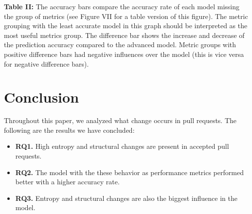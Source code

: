 \documentclass[10pt, conference]{IEEEtran}
\begin{document}
\newline \small \textbf{Table II:} The accuracy bars compare the accuracy rate of each model missing the group of metrics (see Figure VII for a table version of this figure). The metric grouping with the  least accurate model in this graph should be interpreted as the most useful metrics group. The difference bar shows the increase and decrease of the prediction accuracy compared to the advanced model. Metric groups with positive difference bars had negative influences over the model (this is vice versa for negative difference bars).


\section{Conclusion}
\label{conclusion}
Throughout this paper, we analyzed what change occurs in pull requests. The following are the results we have concluded:

\begin{mdframed} 
\begin{itemize}
\item \textbf{RQ1.} High entropy and structural changes are present in accepted pull requests.
\item \textbf{RQ2.} The model with the these behavior as performance metrics performed better with a higher accuracy rate.
\item \textbf{RQ3.} Entropy and structural changes are also the biggest influence in the model.
\end{itemize}
\end{mdframed}
\end{document}
